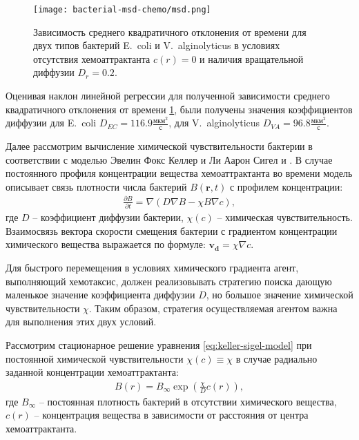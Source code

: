 \begin{figure}[ht]
    \centering
    \texttt{[image: bacterial-msd-chemo/msd.png]}
    \caption{
        Зависимость среднего квадратичного отклонения от времени для двух типов бактерий E.~coli и V.~alginolyticus в условиях отсутствия хемоаттрактанта $c(r)=0$ и наличия вращательной диффузии $D_r=0.2$.
    }
    \label{fig:msd-bacteria}
\end{figure}

Оценивая наклон линейной регрессии для полученной зависимости среднего квадратичного отклонения от времени \cref{fig:msd-bacteria}, были получены значения коэффициентов диффузии для E.~coli $D_{EC}=116.9 \frac{\textrm{мкм}^2}{\textrm{с}}$, для V.~alginolyticus $D_{VA}=96.8 \frac{\textrm{мкм}^2}{\textrm{с}}$.

Далее рассмотрим вычисление химической чувствительности бактерии в соответствии с моделью Эвелин Фокс Келлер и Ли Аарон Сигел и \cite{keller_model_1971}. В случае постоянного профиля концентрации вещества хемоаттрактанта во времени модель описывает связь плотности числа бактерий $B(\textbf{r}, t)$ с профилем концентрации:
\begin{equation}
    \begin{aligned}
        \frac{\partial B}{\partial t}=\nabla (D \nabla B - \chi B \nabla c),
    \label{eq:keller-sigel-model}
    \end{aligned}
\end{equation}
где $D$ -- коэффициент диффузии бактерии, $\chi (c)$ -- химическая чувствительность. Взаимосвязь вектора скорости смещения бактерии с градиентом концентрации химического вещества выражается по формуле: 
$\boldsymbol{v_d}=\chi \nabla c$. 

Для быстрого перемещения в условиях химического градиента агент, выполняющий хемотаксис, должен реализовывать стратегию поиска дающую маленькое значение коэффициента диффузии $D$, но большое значение химической чувствительности $\chi$. Таким образом, стратегия осуществляемая агентом важна для выполнения этих двух условий.

Рассмотрим стационарное решение уравнения \cref{eq:keller-sigel-model} при постоянной химической чувствительности $\chi(c) \equiv \chi$ в случае радиально заданной концентрации хемоаттрактанта:
\begin{equation}
    \begin{aligned}
        B(r) = B_{\infty} \exp \left ( \frac{\chi}{D}c(r) \right ),
    \label{eq:keller-sigel-stationary-solution}
    \end{aligned}
\end{equation}
где $B_{\infty}$ -- постоянная плотность бактерий в отсутствии химического вещества, $c(r)$ -- концентрация вещества в зависимости от расстояния от центра хемоаттрактанта.

